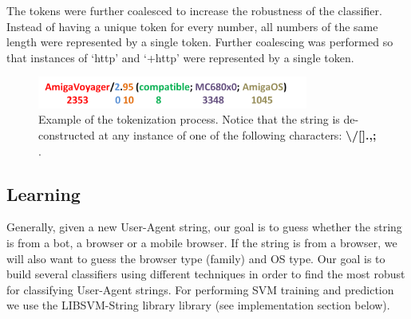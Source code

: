 \documentclass[10pt]{article}
\begin{document}
\begin{multicols}{2}
The tokens were further coalesced to increase the robustness of the classifier.  Instead of having a unique token for every number, all numbers of the same length were represented by a single token.  Further coalescing was performed so that instances of `http' and `+http' were represented by a single token.      

\begin{figure}
\includegraphics[width=3.5in]{token_figure.png}
\caption{Example of the tokenization process.  Notice that the string is de-constructed at any instance of one of the following characters: {\bf \textbackslash /[].,;}  .}
\end{figure}


\subsection{Learning}
Generally, given a new User-Agent string, our goal is to guess whether the string is from a bot, a browser or a mobile browser.  If the string is from a browser, we will also want to guess the browser type (family) and OS type.    Our goal is to build several classifiers using different techniques in order to find the most robust for classifying User-Agent strings.  For performing SVM training and prediction we use the LIBSVM-String library library (see implementation section below).\cite{libsvm}\cite{libsvm-string}  


\end{multicols}
\end{document}
